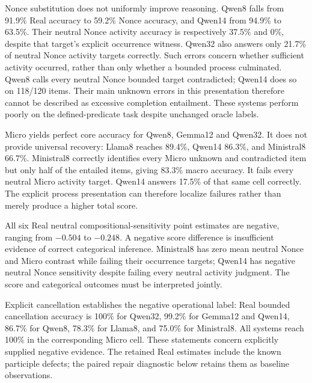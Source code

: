 \documentclass[sigconf,anonymous,review]{acmart}
\begin{document}
Nonce substitution does not uniformly improve reasoning. Qwen8 falls from 91.9\% Real accuracy to 59.2\% Nonce accuracy, and Qwen14 from 94.9\% to 63.5\%. Their neutral Nonce activity accuracy is respectively 37.5\% and 0\%, despite that target's explicit occurrence witness. Qwen32 also answers only 21.7\% of neutral Nonce activity targets correctly. Such errors concern whether sufficient activity occurred, rather than only whether a bounded process culminated. Qwen8 calls every neutral Nonce bounded target contradicted; Qwen14 does so on 118/120 items. Their main unknown errors in this presentation therefore cannot be described as excessive completion entailment. These systems perform poorly on the defined-predicate task despite unchanged oracle labels.

Micro yields perfect core accuracy for Qwen8, Gemma12 and Qwen32. It does not provide universal recovery: Llama8 reaches 89.4\%, Qwen14 86.3\%, and Ministral8 66.7\%. Ministral8 correctly identifies every Micro unknown and contradicted item but only half of the entailed items, giving 83.3\% macro accuracy. It fails every neutral Micro activity target. Qwen14 answers 17.5\% of that same cell correctly. The explicit process presentation can therefore localize failures rather than merely produce a higher total score.

All six Real neutral compositional-sensitivity point estimates are negative, ranging from $-0.504$ to $-0.248$. A negative score difference is insufficient evidence of correct categorical inference. Ministral8 has zero mean neutral Nonce and Micro contrast while failing their occurrence targets; Qwen14 has negative neutral Nonce sensitivity despite failing every neutral activity judgment. The score and categorical outcomes must be interpreted jointly.

Explicit cancellation establishes the negative operational label: Real bounded cancellation accuracy is 100\% for Qwen32, 99.2\% for Gemma12 and Qwen14, 86.7\% for Qwen8, 78.3\% for Llama8, and 75.0\% for Ministral8. All systems reach 100\% in the corresponding Micro cell. These statements concern explicitly supplied negative evidence. The retained Real estimates include the known participle defects; the paired repair diagnostic below retains them as baseline observations.
\end{document}
